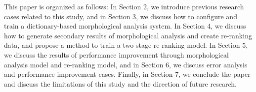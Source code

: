 \documentclass[AMS,STIX2COL]{WileyNJD-v2}
\begin{document}

    This paper is organized as follows:
    In Section 2, we introduce previous research cases related to this study, and in Section 3, we discuss how to configure and train a dictionary-based morphological analysis system.
    In Section 4, we discuss how to generate secondary results of morphological analysis and create re-ranking data, and propose a method to train a two-stage re-ranking model.
    In Section 5, we discuss the results of performance improvement through morphological analysis model and re-ranking model, and in Section 6, we discuss error analysis and performance improvement cases.
    Finally, in Section 7, we conclude the paper and discuss the limitations of this study and the direction of future research.

\end{document}
